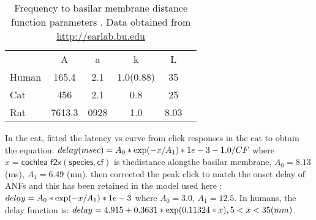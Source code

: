 \begin{table}[ht]
  \centering
  \begin{tabular}{lccccc}
    \hline
    &   A   &   a  &     k     & L \\
    Human & 165.4 &  2.1 & 1.0(0.88) & 35\\
    Cat  &  456  &  2.1 &    0.8    & 25 \\
    Rat  & 7613.3& 0928 &    1.0    & 8.03 \\
    \hline
  \end{tabular}
  \caption[Basilar membrane frequency-distance function parameters]{Frequency to basilar membrane distance function parameters \citep{FitzGeraldBurkittEtAl:2001}. Data obtained from \url{http://earlab.bu.edu} \label{tab:f2x}}
\end{table}

In the cat, \citet{CarneyYin:1988} fitted the latency vs \CF curve from click
responses in the cat to obtain the equation: \( delay (msec) = A_0 * {\rm exp}(
-x / A_1 ) * 1e-3 - 1.0/CF \) where $x = \mathsf{cochlea\_f2x(species, cf)}$ is
thedistance alongthe basilar membrane, $A_0 = 8.13$ (ms), $A_1 = 6.49$
(nm). \citet{HeinzZhangEtAl:2001} then corrected the peak click to match the
onset delay of ANFs and this has been retained in the model used here
\citep{ZilanyBruceEtAl:2009}: \(delay = A_0 * {\rm exp}(-x / A_1) * 1e-3 \)
where $A_0 = 3.0$, $A_1 = 12.5$. In humans, the delay function is: \( delay =
4.915 + 0.3631 * {\rm exp}(0.11324*x) , 5<x<35 (mm) \).


